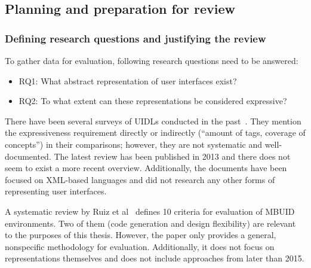 \subsection[Planning and preparation]{Planning and preparation for review}\label{subsec:planning-and-preparation-for-review}

\subsubsection{Defining research questions and justifying the review}
To gather data for evaluation, following research questions need to be answered:
\begin{itemize}
    \item RQ1: What abstract representation of user interfaces exist?
    \item RQ2: To what extent can these representations be considered expressive?
\end{itemize}

There have been several surveys of UIDLs conducted in the past~\cite{Souchon2003, guerrero_garcia_theoretical_2009, guerrero_garcia_theoretical_2011, Jovanovic2013}.
They mention the expressiveness requirement directly or indirectly (\enquote{amount of tags, coverage of concepts}) in their comparisons;
however, they are not systematic and well-documented.
The latest review has been published in 2013 and there does not seem to exist a more recent overview.
Additionally, the documents have been focused on XML-based languages and did not research any other forms of representing user interfaces.

A systematic review by Ruiz et al~\cite{Ruiz2018} defines 10 criteria for evaluation of MBUID environments.
Two of them (code generation and design flexibility) are relevant to the purposes of this thesis.
However, the paper only provides a general, nonspecific methodology for evaluation.
Additionally, it does not focus on representations themselves and does not include approaches from later than 2015.

